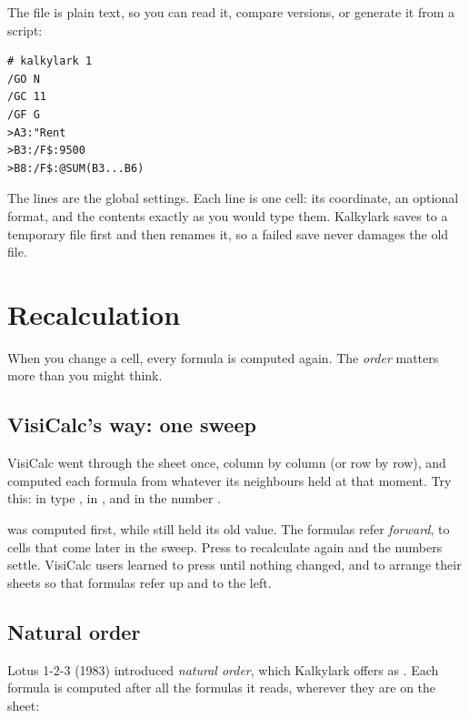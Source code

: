 \documentclass[11pt]{article}
\begin{document}
The file is plain text, so you can read it, compare versions, or generate
it from a script:

\begin{lstlisting}
# kalkylark 1
/GO N
/GC 11
/GF G
>A3:"Rent
>B3:/F$:9500
>B8:/F$:@SUM(B3...B6)
\end{lstlisting}

The  lines are the global settings. Each \typ{>} line is one cell:
its coordinate, an optional format, and the contents exactly as you would
type them. Kalkylark saves to a temporary file first and then renames it, so
a failed save never damages the old file.

\section{Recalculation}\label{sec:recalc}

When you change a cell, every formula is computed again. The \emph{order}
matters more than you might think.

\subsection{VisiCalc's way: one sweep}

VisiCalc went through the sheet once, column by column (or row by row), and
computed each formula from whatever its neighbours held at that moment. Try
this: in  type , in  , and in
 the number .


 was computed first, while  still held its old value. The
formulas refer \emph{forward}, to cells that come later in the sweep. Press
\typ{!} to recalculate again and the numbers settle. VisiCalc users learned
to press \typ{!} until nothing changed, and to arrange their sheets so that
formulas refer up and to the left.

\subsection{Natural order}

Lotus 1-2-3 (1983) introduced \emph{natural order}, which Kalkylark offers
as . Each formula is computed after all the formulas it reads,
wherever they are on the sheet:
\end{document}
